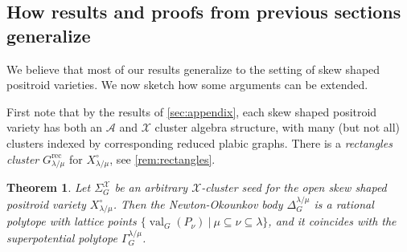 \documentclass{amsart}
\newtheorem{theorem}[thm]{Theorem}
\theoremstyle{definition}
\numberwithin{equation}{section}
\newcommand{\rect}{\mathrm{rec}}
\newcommand{\val}{{\operatorname{val}}}
\begin{document}
\subsection{How results and proofs from previous sections generalize}

We believe that most of our results 
 generalize to the setting of skew shaped positroid varieties.
We now sketch how some  arguments can be extended.

First note that by the results of \cref{sec:appendix}, 
each skew shaped positroid variety
has both an $\mathcal{A}$ and $\mathcal{X}$ cluster algebra structure,
with many (but not all) clusters indexed by corresponding reduced plabic graphs.  There is a \emph{rectangles
cluster} $G_{\lambda/\mu}^{\rect}$
for $X_{\lambda/\mu}^{\circ}$, see \cref{rem:rectangles}.

\begin{theorem}\label{thm:mainskew}
Let $\Sigma_G^{\mathcal{X}}$ be an arbitrary $\mathcal{X}$-cluster
seed for the open skew shaped positroid variety $X_{\lambda/\mu}^{\circ}$.
Then the Newton-Okounkov body $\Delta_G^{\lambda/\mu}$ is a rational
polytope with lattice points $\{\val_G(P_{\nu}) \ \vert \ \mu \subseteq \nu \subseteq \lambda\}$, and it coincides with the superpotential polytope
$\Gamma_{G}^{\lambda/\mu}$.
\end{theorem}
\end{document}
